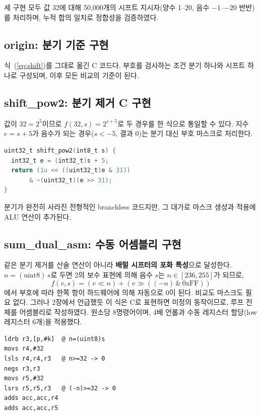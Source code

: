 세 구현 모두 값 32에 대해 50,000개의 시프트 지시자(양수 1--20, 음수 $-1$--$-20$ 반반)를
처리하며, 누적 합의 일치로 정합성을 검증하였다.

\subsection{origin: 분기 기준 구현}

식~(\ref{eq:shift})를 그대로 옮긴 C 코드다. 부호를 검사하는 조건 분기 하나와 시프트
하나로 구성되며, 이후 모든 비교의 기준이 된다.

\subsection{shift\_pow2: 분기 제거 C 구현}

값이 $32 = 2^5$이므로 $f(32,s) = 2^{s+5}$로 두 경우를 한 식으로 통일할 수 있다. 지수
$e = s+5$가 음수가 되는 경우($s < -5$, 결과 0)는 분기 대신 부호 마스크로 처리한다.

\begin{lstlisting}[language=C]
uint32_t shift_pow2(int8_t s) {
  int32_t e = (int32_t)s + 5;
  return (1u << ((uint32_t)e & 31))
       & ~(uint32_t)(e >> 31);
}
\end{lstlisting}

분기가 완전히 사라진 전형적인 branchless 코드지만, 그 대가로 마스크 생성과 적용에 ALU
연산이 추가된다.

\subsection{sum\_dual\_asm: 수동 어셈블리 구현}

같은 분기 제거를 산술 연산이 아니라 \textbf{배럴 시프터의 포화 특성}으로 달성한다.
$n = (\mathrm{uint8})\,s$로 두면 2의 보수 표현에 의해 음수 $s$는 $n \in [236,255]$가
되므로,
\begin{equation}
f(v,s) = (v \ll n) + (v \gg ((-n)\,\&\,\mathrm{0xFF}))
\label{eq:dual}
\end{equation}
에서 부호에 따라 한쪽 항이 하드웨어에 의해 자동으로 0이 된다. 비교도 마스크도 필요 없다.
그러나 2장에서 언급했듯 이 식은 C로 표현하면 미정의 동작이므로, 루프 전체를 어셈블리로
작성하였다. 원소당 8명령어이며, 4배 언롤과 수동 레지스터 할당(low 레지스터 6개)을
적용했다.

\begin{lstlisting}
ldrb r3,[p,#k]  @ n=(uint8)s
movs r4,#32
lsls r4,r4,r3   @ n>=32 -> 0
negs r3,r3
movs r5,#32
lsrs r5,r5,r3   @ (-n)>=32 -> 0
adds acc,acc,r4
adds acc,acc,r5
\end{lstlisting}
